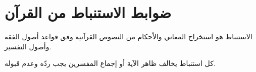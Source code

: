 
\section{ضوابط الاستنباط من القرآن}

الاستنباط هو استخراج المعاني والأحكام من النصوص القرآنية وفق قواعد أصول الفقه وأصول التفسير.

\begin{warningbox}
كل استنباط يخالف ظاهر الآية أو إجماع المفسرين يجب ردّه وعدم قبوله.
\end{warningbox}
